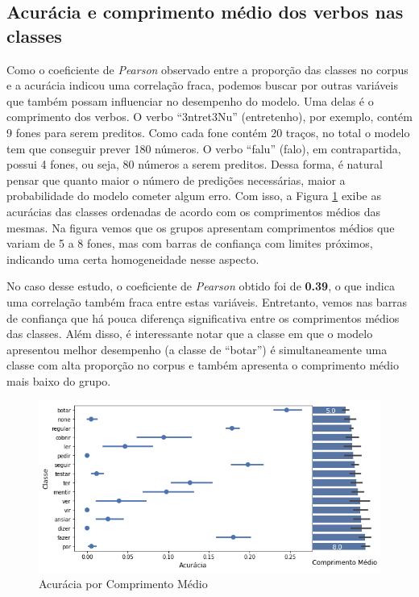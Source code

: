 \subsection{Acurácia e comprimento médio dos verbos nas classes}

Como o coeficiente de \textit{Pearson} observado entre a proporção das classes no corpus e a acurácia indicou uma correlação fraca, podemos buscar por outras variáveis que também possam influenciar no desempenho do modelo. Uma delas é o comprimento dos verbos. O verbo “3ntret3Nu” (entretenho), por exemplo, contém 9 fones para serem preditos. Como cada fone contém 20 traços, no total o modelo tem que conseguir prever 180 números. O verbo “falu” (falo), em contrapartida, possui 4 fones, ou seja, 80 números a serem preditos. Dessa forma, é natural pensar que quanto maior o número de predições necessárias, maior a probabilidade do modelo cometer algum erro. Com isso, a Figura \ref{fig:kfoldprop} exibe as acurácias das classes ordenadas de acordo com os comprimentos médios das mesmas. Na figura vemos que os grupos apresentam comprimentos médios que variam de 5 a 8 fones, mas com barras de confiança com limites próximos, indicando uma certa homogeneidade nesse aspecto.

No caso desse estudo, o coeficiente de \textit{Pearson} obtido foi de \textbf{0.39}, o que indica uma correlação também fraca entre estas variáveis. Entretanto, vemos nas barras de confiança que há pouca diferença significativa entre os comprimentos médios das classes. Além disso, é interessante notar que a classe em que o modelo apresentou melhor desempenho (a classe de “botar”) é simultaneamente uma classe com alta proporção no corpus e também apresenta o comprimento médio mais baixo do grupo.

\begin{figure}[H]
  \centering
  \includegraphics[width=0.8\linewidth]{img/comp_acc.png}
  \caption{Acurácia por Comprimento Médio}
  \label{fig:kfoldprop}
\end{figure}


